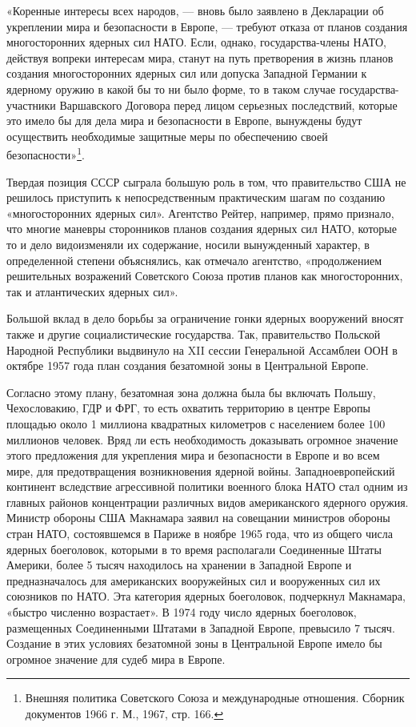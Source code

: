 \documentclass[12pt, a4paper, openany]{book}
\begin{document}
	«Коренные интересы всех народов, — вновь было заявлено в Декларации об укреплении мира и безопасности в Европе, — требуют отказа от планов создания многосторонних ядерных сил НАТО. Если, однако, государства-члены НАТО, действуя вопреки интересам мира, станут на путь претворения в жизнь планов создания многосторонних ядерных сил или допуска Западной Германии к ядерному оружию в какой бы то ни было форме, то в таком случае государства-участники Варшавского Договора перед лицом серьезных последствий, которые это имело бы для дела мира и безопасности в Европе, вынуждены будут осуществить необходимые защитные меры по обеспечению своей безопасности»{\footnote{Внешняя политика Советского Союза и международные отношения. Сборник документов 1966 г. М., 1967, стр. 166.}}.
	
	
	Твердая позиция СССР сыграла большую роль в том, что правительство США не решилось приступить к непосредственным практическим шагам по созданию «многосторонних ядерных сил». Агентство Рейтер, например, прямо признало, что многие маневры сторонников планов создания ядерных сил НАТО, которые то и дело видоизменяли их содержание, носили вынужденный характер, в определенной степени объяснялись, как отмечало агентство, «продолжением решительных возражений Советского Союза против планов как многосторонних, так и атлантических ядерных сил».
	
	Большой вклад в дело борьбы за ограничение гонки ядерных вооружений вносят также и другие социалистические государства. Так, правительство Польской Народной Республики выдвинуло на XII сессии Генеральной Ассамблеи ООН в октябре 1957 года план создания безатомной зоны в Центральной Европе.
	
	Согласно этому плану, безатомная зона должна была бы включать Польшу, Чехословакию, ГДР и ФРГ, то есть охватить территорию в центре Европы площадью около 1 миллиона квадратных километров с населением более 100 миллионов человек. Вряд ли есть необходимость доказывать огромное значение этого предложения для укрепления мира и безопасности в Европе и во всем мире, для предотвращения возникновения ядерной войны. Западноевропейский континент вследствие агрессивной политики военного блока НАТО стал одним из главных районов концентрации различных видов американского ядерного оружия. Министр обороны США Макнамара заявил на совещании министров обороны стран НАТО, состоявшемся в Париже в ноябре 1965 года, что из общего числа ядерных боеголовок, которыми в то время располагали Соединенные Штаты Америки, более 5 тысяч находилось на хранении в Западной Европе и предназначалось для американских вооружейных сил и вооруженных сил их союзников по НАТО. Эта категория ядерных боеголовок, подчеркнул Макнамара, «быстро численно возрастает». В 1974 году число ядерных боеголовок, размещенных Соединенными Штатами в Западной Европе, превысило 7 тысяч. Создание в этих условиях безатомной зоны в Центральной Европе имело бы огромное значение для судеб мира в Европе.
	
\end{document}
